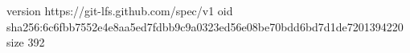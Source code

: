 version https://git-lfs.github.com/spec/v1
oid sha256:6c6fbb7552e4e8aa5ed7fdbb9c9a0323ed56e08be70bdd6bd7d1de7201394220
size 392
